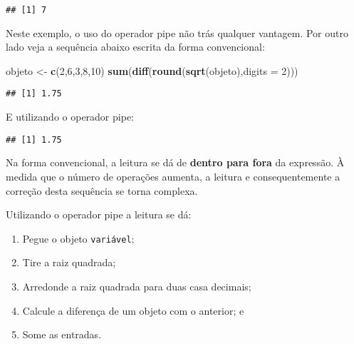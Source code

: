 \documentclass[
]{book}
\newenvironment{Shaded}{\begin{snugshade}}{\end{snugshade}}
\newcommand{\DataTypeTok}[1]{\textcolor[rgb]{0.13,0.29,0.53}{#1}}
\newcommand{\DecValTok}[1]{\textcolor[rgb]{0.00,0.00,0.81}{#1}}
\newcommand{\KeywordTok}[1]{\textcolor[rgb]{0.13,0.29,0.53}{\textbf{#1}}}
\newcommand{\NormalTok}[1]{#1}
\newcommand{\OperatorTok}[1]{\textcolor[rgb]{0.81,0.36,0.00}{\textbf{#1}}}
\newcommand{\StringTok}[1]{\textcolor[rgb]{0.31,0.60,0.02}{#1}}
\begin{document}
\begin{verbatim}
## [1] 7
\end{verbatim}

Neste exemplo, o uso do operador pipe não trás qualquer vantagem. Por outro lado veja a sequência abaixo escrita da forma convencional:

\begin{Shaded}
\begin{Highlighting}[]
\NormalTok{objeto <-}\StringTok{ }\KeywordTok{c}\NormalTok{(}\DecValTok{2}\NormalTok{,}\DecValTok{6}\NormalTok{,}\DecValTok{3}\NormalTok{,}\DecValTok{8}\NormalTok{,}\DecValTok{10}\NormalTok{)}
\KeywordTok{sum}\NormalTok{(}\KeywordTok{diff}\NormalTok{(}\KeywordTok{round}\NormalTok{(}\KeywordTok{sqrt}\NormalTok{(objeto),}\DataTypeTok{digits =} \DecValTok{2}\NormalTok{)))}
\end{Highlighting}
\end{Shaded}

\begin{verbatim}
## [1] 1.75
\end{verbatim}

E utilizando o operador pipe:

\begin{Shaded}
\end{Shaded}

\begin{verbatim}
## [1] 1.75
\end{verbatim}

Na forma convencional, a leitura se dá de \textbf{dentro para fora} da expressão. À medida que o número de operações aumenta, a leitura e consequentemente a correção desta sequência se torna complexa.

Utilizando o operador pipe a leitura se dá:

\begin{enumerate}
\def\labelenumi{\arabic{enumi}.}
\item
  Pegue o objeto \texttt{variável};
\item
  Tire a raiz quadrada;
\item
  Arredonde a raiz quadrada para duas casa decimais;
\item
  Calcule a diferença de um objeto com o anterior; e
\item
  Some as entradas.
\end{enumerate}
\end{document}
